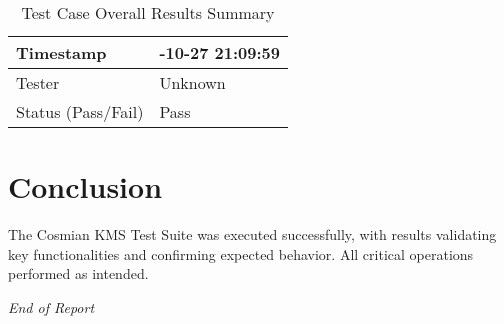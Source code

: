 \documentclass[a4paper,12pt]{article}
\begin{document}
    \begin{table}[h]
        \centering
        \begin{tabularx}{1\textwidth}{ 
          | >{\raggedright\arraybackslash}X 
          | >{\raggedright\arraybackslash}X | }
            \hline
            Timestamp & 2024-10-27 21:09:59 \\
            \hline
            Tester & Unknown \\
            \hline
            \rowcolor{green!30} %
            Status (Pass/Fail) & Pass \\
            \hline
        \end{tabularx}
        \caption{Test Case Overall Results Summary}
        \label{tab:test_case_info}
    \end{table}

    \newpage
    
\newpage

\section{Conclusion}

The Cosmian KMS Test Suite was executed successfully, with results validating key functionalities and confirming expected behavior. All critical operations performed as intended.

\begin{center}
\textit{End of Report}
\end{center}
\end{document}
